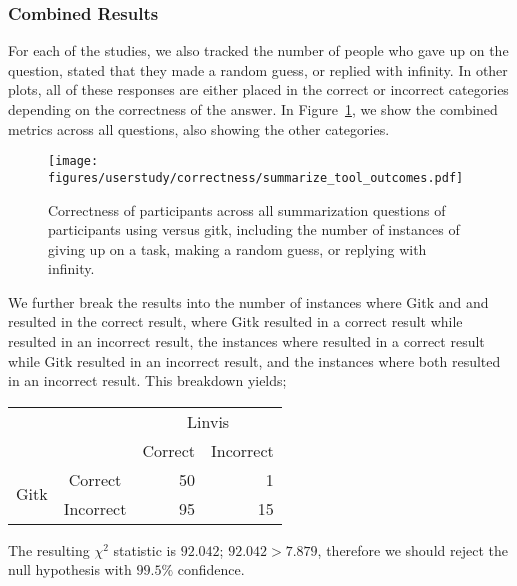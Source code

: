 
\subsubsection{Combined Results}
\label{ssub:combined_results}

For each of the studies, we also tracked the number of people who gave
up on the question, stated that they made a random guess, or replied
with infinity. In other plots, all of these responses are either placed
in the correct or incorrect categories depending on the correctness of
the answer. In Figure~\ref{fig:summarization_correctness}, we show the
combined metrics across all questions, also showing the other
categories.

\begin{figure}[htpb]
  \centering
  \texttt{[image: figures/userstudy/correctness/summarize\_tool\_outcomes.pdf]}
  \caption{Correctness of participants across all summarization
    questions of participants using \tool versus gitk, including the
    number of instances of giving up on a task, making a random guess,
    or replying with infinity.}
  \label{fig:summarization_correctness}
\end{figure}


We further break the results into the number of instances where Gitk and
and \tool resulted in the correct result, where Gitk resulted in a
correct result while \tool resulted in an incorrect result, the
instances where \tool resulted in a correct result while Gitk resulted
in an incorrect result, and the instances where both resulted in an
incorrect result. This breakdown yields;

\begin{center}
  \begin{tabular}{cc|rr}
                          &           & \multicolumn{2}{c}{Linvis}\\
                          &           & Correct                      & Incorrect\\\hline
    \multirow{2}{*}{Gitk} & Correct   & 50                           & 1\\
                          & Incorrect & 95                           & 15\\
  \end{tabular}
\end{center}

The resulting $\chi^2$ statistic is $92.042$; $92.042 > 7.879$,
therefore we should reject the null hypothesis with $99.5\%$ confidence.
